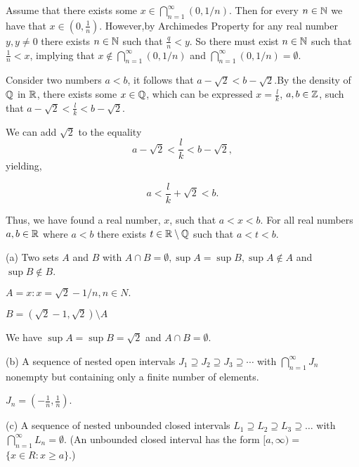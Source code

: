 \documentclass{report}
\begin{document}
\par \bigskip


Assume that there exists some $x \in \bigcap_{n=1}^{\infty}(0,1 / n).$ Then for every $n \in \NN$ we have that $ x \in (0, \frac{1}{n})$. However,by Archimedes Property for any real number  $y, y\not= 0$ there exists $n \in \NN$ such that $\frac{q}{n} < y$. So there must exist $n \in \NN$ such that $\frac{1}{n} < x$, implying that $x \not\in \bigcap_{n=1}^{\infty}(0,1 / n)$ and $\bigcap_{n=1}^{\infty}(0,1 / n) = \emptyset.$


\sol Consider two numbers $a <b$, it follows that $a - \sqrt{2} < b - \sqrt{2}.$By the density of $\QQ$ in $\RR$, there exists some $x \in \QQ$, which can be expressed $x= \frac{l}{k}$, $a,b \in \ZZ$, such that $a - \sqrt{2} < \frac{l}{k}< b - \sqrt{2}$.

We can add $\sqrt{2}$ to the equality 
$$
a - \sqrt{2} < \frac{l}{k}< b - \sqrt{2}
,$$ yielding, 

$$
a < \frac{l}{k}+ \sqrt{2} < b 
.$$ 

Thus, we have found a real number, $x$, such that $a < x < b.$ For all real numbers $a, b \in \RR$ where $a < b$ there exists $t \in \RR \setminus \QQ$ such that $a<t<b.$


(a) Two sets $A$ and $B$ with $A \cap B=\emptyset, \sup A=\sup B, \sup A \notin A$ and $\sup B \notin B$.

\par \bigskip 
$ A = { x : x = \sqrt{2} - 1/n, n \in N }.$ \par $B = (\sqrt{2} -1,\sqrt{2}) \setminus A$ 
\par We have $ \sup A = \sup B = \sqrt{2}$ and $A \cap B = \emptyset.$


\par \bigskip
(b) A sequence of nested open intervals $J_1 \supseteq J_2 \supseteq J_3 \supseteq \cdots$ with $\bigcap_{n=1}^{\infty} J_n$ nonempty but containing only a finite number of elements.
\par \bigskip 
$J_n = (-\frac{1}{n}, \frac{1}{n})$.
\par \bigskip
(c) A sequence of nested unbounded closed intervals $L_1 \supseteq L_2 \supseteq L_3 \supseteq \ldots$ with $\bigcap_{n=1}^{\infty} L_n=\emptyset$. (An unbounded closed interval has the form $[a, \infty)=$ $\{x \in R: x \geq a\}$.)
\end{document}
